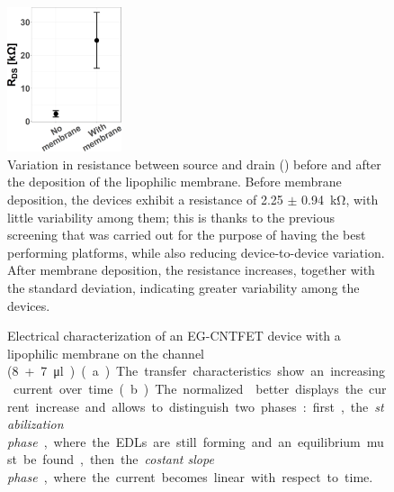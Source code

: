 \begin{figure}
    \centering
    \includegraphics[width = 0.3\textwidth]{figures/chapter3/EGFET/Rds_change.png}
    \caption{Variation in resistance between source and drain (\rds{}) before and after the deposition of the lipophilic membrane. Before membrane deposition, the devices exhibit a resistance of \SI{2.25}{} $\pm$ \SI{0.94}{\kohm}, with little variability among them; this is thanks to the previous screening that was carried out for the purpose of having the best performing platforms, while also reducing device-to-device variation. After membrane deposition, the resistance increases, together with the standard deviation, indicating greater variability among the devices.}
    \label{fig:rdsChange}
\end{figure}

\begin{figure}
    \centering
    \quad
    \caption{
        Electrical characterization of an EG-CNTFET device with a lipophilic membrane on the channel (\SI{8}+\SI{7}{\micro\l}). 
        (a) The transfer characteristics show an increasing current over time.
        (b) The normalized \ion{} better displays the current increase and allows to distinguish two phases: first, the \emph{stabilization phase}, where the EDLs are still forming and an equilibrium must be found, then the \emph{costant slope phase}, where the current becomes linear with respect to time.}
    \label{fig:Mem}
\end{figure}

